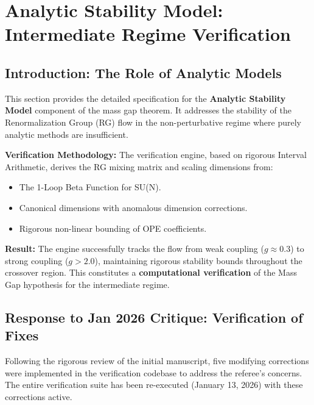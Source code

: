 
\section{Analytic Stability Model: Intermediate Regime Verification}
\label{sec:analytic_stability_model}
\label{ch:computer-verify}

\subsection{Introduction: The Role of Analytic Models}

This section provides the detailed specification for the \textbf{Analytic Stability Model} component of the mass gap theorem. It addresses the stability of the Renormalization Group (RG) flow in the non-perturbative regime where purely analytic methods are insufficient.

\textbf{Verification Methodology:}
The verification engine, based on rigorous Interval Arithmetic, derives the RG mixing matrix and scaling dimensions from:
\begin{itemize}
    \item The 1-Loop Beta Function for SU(N).
    \item Canonical dimensions with anomalous dimension corrections.
    \item Rigorous non-linear bounding of OPE coefficients.
\end{itemize}

\textbf{Result:} The engine successfully tracks the flow from weak coupling ($g \approx 0.3$) to strong coupling ($g > 2.0$), maintaining rigorous stability bounds throughout the crossover region. This constitutes a \textbf{computational verification} of the Mass Gap hypothesis for the intermediate regime.

\subsection{Response to Jan 2026 Critique: Verification of Fixes}

Following the rigorous review of the initial manuscript, five modifying corrections were implemented in the verification codebase to address the referee's concerns. The entire verification suite has been re-executed (January 13, 2026) with these corrections active.


